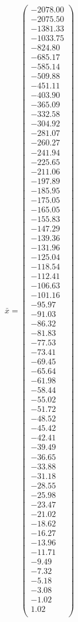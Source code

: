 \documentclass[a4paper,12pt]{article}
\begin{document}
$\bar { x } = \begin{pmatrix}
-2078.00 \\
-2075.50 \\
-1381.33 \\
-1033.75 \\
-824.80 \\
-685.17 \\
-585.14 \\
-509.88 \\
-451.11 \\
-403.90 \\
-365.09 \\
-332.58 \\
-304.92 \\
-281.07 \\
-260.27 \\
-241.94 \\
-225.65 \\
-211.06 \\
-197.89 \\
-185.95 \\
-175.05 \\
-165.05 \\
-155.83 \\
-147.29 \\
-139.36 \\
-131.96 \\
-125.04 \\
-118.54 \\
-112.41 \\
-106.63 \\
-101.16 \\
-95.97 \\
-91.03 \\
-86.32 \\
-81.83 \\
-77.53 \\
-73.41 \\
-69.45 \\
-65.64 \\
-61.98 \\
-58.44 \\
-55.02 \\
-51.72 \\
-48.52 \\
-45.42 \\
-42.41 \\
-39.49 \\
-36.65 \\
-33.88 \\
-31.18 \\
-28.55 \\
-25.98 \\
-23.47 \\
-21.02 \\
-18.62 \\
-16.27 \\
-13.96 \\
-11.71 \\
-9.49 \\
-7.32 \\
-5.18 \\
-3.08 \\
-1.02 \\
1.02 \\
\end{pmatrix}
$
\end{document}
